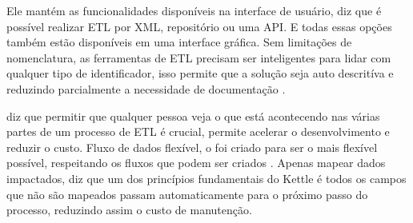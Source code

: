 Ele mantém as funcionalidades disponíveis na interface de usuário,  diz que é possível realizar ETL por XML, repositório ou uma API. E todas essas opções também estão disponíveis em uma interface gráfica. Sem limitações de nomenclatura, as ferramentas de ETL precisam ser inteligentes para lidar com qualquer tipo de identificador, isso permite que a solução seja auto descritíva e reduzindo parcialmente a necessidade de documentação \citep{kettle}.

 diz que permitir que qualquer pessoa veja o que está acontecendo nas várias partes de um processo de ETL é crucial, permite acelerar o desenvolvimento e reduzir o custo. Fluxo de dados flexível, o \pdi foi criado para ser o mais flexível possível, respeitando os fluxos que podem ser criados \citep{kettle}. Apenas mapear dados impactados,  diz que um dos princípios fundamentais do Kettle é todos os campos que não são mapeados passam automaticamente para o próximo passo do processo, reduzindo assim o custo de manutenção.


